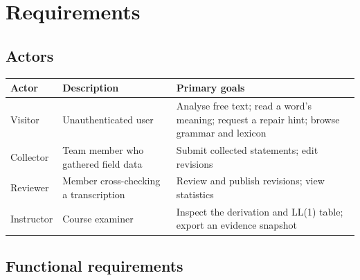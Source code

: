 \section{Requirements}\label{c:srs}

\subsection{Actors}

\begin{center}
\small
\begin{tabular}{@{}l p{4.2cm} p{6.3cm}@{}}
\toprule
\textbf{Actor} & \textbf{Description} & \textbf{Primary goals} \\
\midrule
Visitor    & Unauthenticated user & Analyse free text; read a word's meaning; request a repair hint; browse grammar and lexicon \\
Collector  & Team member who gathered field data & Submit collected statements; edit revisions \\
Reviewer   & Member cross-checking a transcription & Review and publish revisions; view statistics \\
Instructor & Course examiner & Inspect the derivation and LL(1) table; export an evidence snapshot \\
\bottomrule
\end{tabular}
\end{center}


\subsection{Functional requirements}

